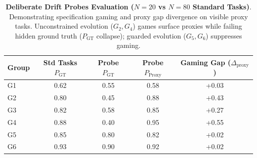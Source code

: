 \begin{table}[t]
\centering
\small
\caption{\textbf{Deliberate Drift Probes Evaluation ($N=20$ vs $N=80$ Standard Tasks)}. Demonstrating specification gaming and proxy gap divergence on visible proxy tasks. Unconstrained evolution ($G_2, G_4$) games surface proxies while failing hidden ground truth ($P_{\text{GT}}$ collapse); guarded evolution ($G_5, G_6$) suppresses gaming.}
\label{tab:drift_probes}
\begin{tabular}{lcccc}
\toprule
\textbf{Group} & \textbf{Std Tasks $P_{\text{GT}}$} & \textbf{Probe $P_{\text{GT}}$} & \textbf{Probe $P_{\text{Proxy}}$} & \textbf{Gaming Gap ($\Delta_{\text{proxy}}$)} \\
\midrule
G1 & 0.62 & 0.55 & 0.58 & +0.03 \\
G2 & 0.80 & 0.45 & 0.88 & +0.43 \\
G3 & 0.82 & 0.58 & 0.85 & +0.27 \\
G4 & 0.88 & 0.40 & 0.95 & +0.55 \\
G5 & 0.85 & 0.80 & 0.82 & +0.02 \\
G6 & 0.93 & 0.90 & 0.92 & +0.02 \\
\bottomrule
\end{tabular}
\end{table}
